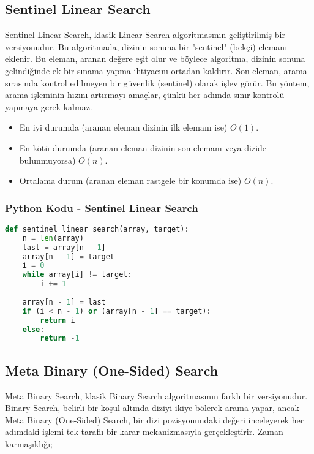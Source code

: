 \newpage

\subsection{Sentinel Linear Search}

Sentinel Linear Search, klasik Linear Search algoritmasının geliştirilmiş bir versiyonudur. Bu algoritmada, dizinin sonuna bir "sentinel" (bekçi) elemanı eklenir. Bu eleman, aranan değere eşit olur ve böylece algoritma, dizinin sonuna gelindiğinde ek bir sınama yapma ihtiyacını ortadan kaldırır. Son eleman, arama sırasında kontrol edilmeyen bir güvenlik (sentinel) olarak işlev görür. Bu yöntem, arama işleminin hızını artırmayı amaçlar, çünkü her adımda sınır kontrolü yapmaya gerek kalmaz.

\begin{itemize}
    \item En iyi durumda (aranan eleman dizinin ilk elemanı ise) $O(1)$.
    \item En kötü durumda (aranan eleman dizinin son elemanı veya dizide bulunmuyorsa) $O(n)$.
    \item Ortalama durum (aranan eleman rastgele bir konumda ise) $O(n)$.
\end{itemize}

\subsubsection{Python Kodu - Sentinel Linear Search}

\begin{lstlisting}[language=Python]
def sentinel_linear_search(array, target):
    n = len(array)
    last = array[n - 1]
    array[n - 1] = target
    i = 0
    while array[i] != target:
        i += 1
    
    array[n - 1] = last
    if (i < n - 1) or (array[n - 1] == target):
        return i
    else:
        return -1
\end{lstlisting}

\newpage

\subsection{Meta Binary (One-Sided) Search}

Meta Binary Search, klasik Binary Search algoritmasının farklı bir versiyonudur. Binary Search, belirli bir koşul altında diziyi ikiye bölerek arama yapar, ancak Meta Binary (One-Sided) Search, bir dizi pozisyonundaki değeri inceleyerek her adımdaki işlemi tek taraflı bir karar mekanizmasıyla gerçekleştirir. Zaman karmaşıklığı;

